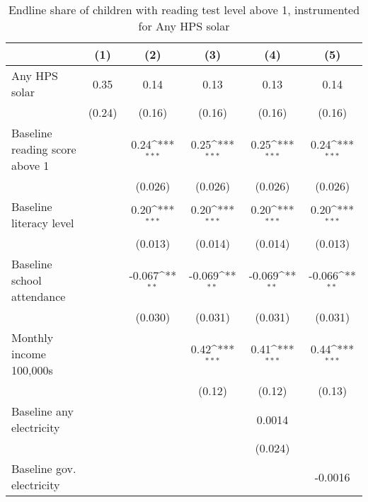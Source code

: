 \begin{table}[htbp]\centering
\def\sym#1{\ifmmode^{#1}\else\(^{#1}\)\fi}
\caption{Endline share of children with reading test level above 1, instrumented for Any HPS solar}
\begin{tabular*}{1\hsize}{@{\hskip\tabcolsep\extracolsep\fill}l*{5}{c}}
\toprule
                &\multicolumn{1}{c}{(1)}         &\multicolumn{1}{c}{(2)}         &\multicolumn{1}{c}{(3)}         &\multicolumn{1}{c}{(4)}         &\multicolumn{1}{c}{(5)}         \\
\midrule
Any HPS solar   &     0.35         &     0.14         &     0.13         &     0.13         &     0.14         \\
                &   (0.24)         &   (0.16)         &   (0.16)         &   (0.16)         &   (0.16)         \\
Baseline reading score above 1&                  &     0.24\sym{***}&     0.25\sym{***}&     0.25\sym{***}&     0.24\sym{***}\\
                &                  &  (0.026)         &  (0.026)         &  (0.026)         &  (0.026)         \\
Baseline literacy level&                  &     0.20\sym{***}&     0.20\sym{***}&     0.20\sym{***}&     0.20\sym{***}\\
                &                  &  (0.013)         &  (0.014)         &  (0.014)         &  (0.013)         \\
Baseline school attendance&                  &   -0.067\sym{**} &   -0.069\sym{**} &   -0.069\sym{**} &   -0.066\sym{**} \\
                &                  &  (0.030)         &  (0.031)         &  (0.031)         &  (0.031)         \\
Monthly income 100,000s&                  &                  &     0.42\sym{***}&     0.41\sym{***}&     0.44\sym{***}\\
                &                  &                  &   (0.12)         &   (0.12)         &   (0.13)         \\
Baseline any electricity&                  &                  &                  &   0.0014         &                  \\
                &                  &                  &                  &  (0.024)         &                  \\
Baseline gov. electricity&                  &                  &                  &                  &  -0.0016         \\

\end{tabular*}
\end{table}
